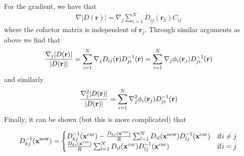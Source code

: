 \documentclass[aps,prc,twocolumn,floatfix]{revtex4}
\def\xvec{\textbf{x}}
\def\rvec{\textbf{r}}
\begin{document}
\begin{appendices}
For the gradient, we have that 
\begin{align}
 \nabla |D(\rvec)| = \nabla_j \sum_{i=1}^N D_{ij}(\rvec_k) C_{ij}
\end{align}
where the cofactor matrix is independent of $\rvec_j$. Through similar arguments as above we find that 
\begin{equation}
 {\nabla_j |D(\rvec)| \over |D(\rvec)|} = \sum_{i=1}^N \nabla_j D_{ij}(\rvec) D_{ji}^{-1}(\rvec) = \sum_{i=1}^N \nabla_j \phi_i(\rvec_j) D_{ji}^{-1}(\rvec)
\end{equation}
and similarly
\begin{equation}
 {\nabla_j^2 |D(\rvec)| \over |D(\rvec)|} = \sum_{i=1}^N \nabla_j^2 \phi_i(\rvec_j) D_{ji}^{-1}(\rvec)
\end{equation}
Finally, it can be shown (but this is more complicated) that
\begin{widetext}
\begin{equation}
 D_{kj}^{-1}(\xvec^{\rm new}) = \begin{cases}  D_{kj}^{-1}(\xvec^{\rm cur}) - {D_{ki}(\xvec^{\rm cur}) \over R}\sum_{l=1}^N D_{il}(\xvec^{\rm new})D_{lj}^{-1}(\xvec^{\rm cur}) & {\rm if }  i \ne j \\ {D_{ki}(\xvec^{\rm cur}) \over R}\sum_{l=1}^N D_{il}(\xvec^{\rm cur})D_{lj}^{-1}(\xvec^{\rm cur}) & {\rm if }  i = j \end{cases}
\end{equation}
\end{widetext}
 
\end{appendices}
\end{document}

